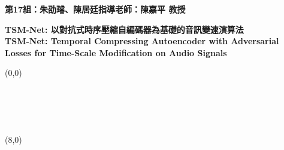 \documentclass{article}
\begin{document}
\thispagestyle{empty}
\membersize \textbf{第17組：朱劭璿、陳居廷}\hspace{20.5cm}\textbf{指導老師：陳嘉平 教授}
\bigskip

\titlesize \textbf{TSM-Net: 以對抗式時序壓縮自編碼器為基礎的音訊變速演算法 \\
TSM-Net: Temporal Compressing Autoencoder with Adversarial Losses for Time-Scale Modification on Audio Signals}

\begin{textblock}{7.0}(0,0)
 \\
\Large \lipsum[1-1] \\

\medskip
{} \\
\Large \lipsum[2-2] \\

\medskip
{} \\
\Large \lipsum[3-3]
\end{textblock}

\begin{textblock}{7.0}(8,0)
 \\
\Large \lipsum[4-4]
\large 

\medskip
{} \\
\Large \lipsum[5-5]
\end{textblock}
\end{document}
